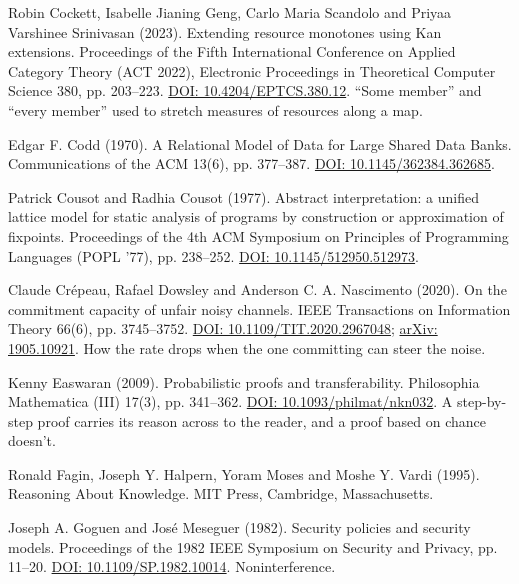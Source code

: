 \documentclass[11pt,twoside]{article}
\theoremstyle{thielethm}
\theoremstyle{thieledef}
\theoremstyle{thieledef}
\theoremstyle{thieledef}
\theoremstyle{thielethm}
\theoremstyle{thieleobs}
\theoremstyle{thielethm}
\begin{document}
\noindent Robin Cockett, Isabelle Jianing Geng, Carlo Maria Scandolo and Priyaa Varshinee Srinivasan (2023). Extending resource monotones using Kan extensions. Proceedings of the Fifth International Conference on Applied Category Theory (ACT 2022), Electronic Proceedings in Theoretical Computer Science 380, pp. 203--223. \href{https://doi.org/10.4204/EPTCS.380.12}{DOI: 10.4204/EPTCS.380.12}. ``Some member'' and ``every member'' used to stretch measures of resources along a map.
\par\medskip

\noindent Edgar F. Codd (1970). A Relational Model of Data for Large Shared Data Banks. Communications of the ACM 13(6), pp. 377--387. \href{https://doi.org/10.1145/362384.362685}{DOI: 10.1145/362384.362685}.
\par\medskip

\noindent Patrick Cousot and Radhia Cousot (1977). Abstract interpretation: a unified lattice model for static analysis of programs by construction or approximation of fixpoints. Proceedings of the 4th ACM Symposium on Principles of Programming Languages (POPL '77), pp. 238--252. \href{https://doi.org/10.1145/512950.512973}{DOI: 10.1145/512950.512973}.
\par\medskip

\noindent Claude Cr\'epeau, Rafael Dowsley and Anderson C. A. Nascimento (2020). On the commitment capacity of unfair noisy channels. IEEE Transactions on Information Theory 66(6), pp. 3745--3752. \href{https://doi.org/10.1109/TIT.2020.2967048}{DOI: 10.1109/TIT.2020.2967048}; \href{https://arxiv.org/abs/1905.10921}{arXiv: 1905.10921}. How the rate drops when the one committing can steer the noise.
\par\medskip

\noindent Kenny Easwaran (2009). Probabilistic proofs and transferability. Philosophia Mathematica (III) 17(3), pp. 341--362. \href{https://doi.org/10.1093/philmat/nkn032}{DOI: 10.1093/philmat/nkn032}. A step-by-step proof carries its reason across to the reader, and a proof based on chance doesn't.
\par\medskip

\noindent Ronald Fagin, Joseph Y. Halpern, Yoram Moses and Moshe Y. Vardi (1995). Reasoning About Knowledge. MIT Press, Cambridge, Massachusetts.
\par\medskip

\noindent Joseph A. Goguen and Jos\'e Meseguer (1982). Security policies and security models. Proceedings of the 1982 IEEE Symposium on Security and Privacy, pp. 11--20. \href{https://doi.org/10.1109/SP.1982.10014}{DOI: 10.1109/SP.1982.10014}. Noninterference.
\par\medskip
\end{document}
